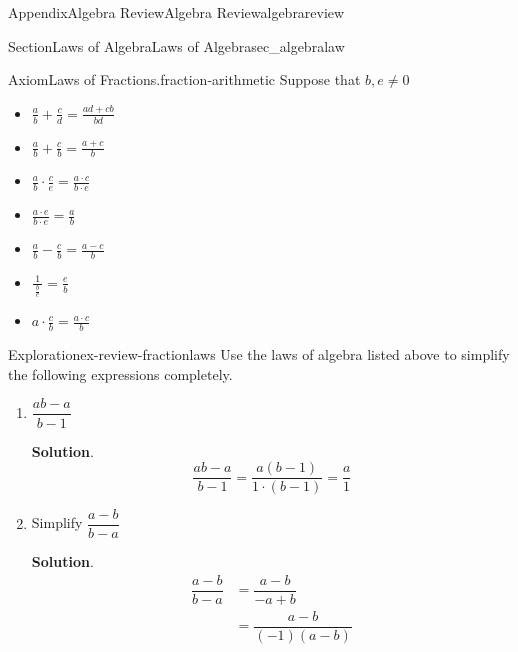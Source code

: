 \documentclass{tufte-book}
\newcommand{\blocktitlefont}{\relax}
\numberwithin{equation}{chapter}
\newcommand{\amp}{&}
\begin{document}
\begin{appendixptx}{Appendix}{Algebra Review}{}{Algebra Review}{}{}{algebrareview}
\begin{sectionptx}{Section}{Laws of Algebra}{}{Laws of Algebra}{}{}{sec_algebralaw}
\begin{axiom}{Axiom}{Laws of Fractions.}{}{fraction-arithmetic}
Suppose that \(b,e\neq 0\)%
\begin{sidebyside}{2}{0.1}{0.1}{0}%
\begin{sbspanel}{0.4}%
%
\begin{itemize}[label=$\circ$]
\item{}\(\displaystyle \frac{a}{b} + \frac{c}{d} = \frac{ad + cb}{bd}\)%
\item{}\(\displaystyle \frac{a}{b} + \frac{c}{b}=  \frac{a+c}{b}\)%
\item{}\(\displaystyle \frac{a}{b} \cdot \frac{c}{e} =  \frac{a\cdot c}{b\cdot e}\)%
\item{} \(\displaystyle \frac{a\cdot e}{b\cdot e} = \frac{a}{b}\)%
\end{itemize}
\end{sbspanel}%
\begin{sbspanel}{0.4}%
%
\begin{itemize}[label=$\circ$]
\item{}\(\displaystyle \frac{a}{b} - \frac{c}{b} =  \frac{a-c}{b}\)%
\item{}\(\displaystyle \frac{1}{\ \frac{b}{e}\ }=  \frac{e}{b}\)%
\item{}\(\displaystyle a\cdot \frac{c}{b}=  \frac{a\cdot c}{b}\)%
\end{itemize}
\end{sbspanel}%
\end{sidebyside}%
\end{axiom}
\begin{exploration}{Exploration}{}{ex-review-fractionlaws}%
Use the laws of algebra listed above to simplify the following expressions completely.%
\begin{enumerate}[font=\bfseries,label=(\alph*),ref=\alph*]%
\item{}\(\dfrac{ab - a}{b-1}\)%
\par\smallskip%
\noindent\textbf{\blocktitlefont Solution}.\hypertarget{ex-review-fractionlaws-2-2}{}\quad{}%
\begin{equation*}
\dfrac{ab - a}{b-1} = \dfrac{a(b-1)}{1\cdot (b-1)} = \dfrac{a}{1}
\end{equation*}
%
\item{}Simplify \(\dfrac{a-b}{b-a}\)%
\par\smallskip%
\noindent\textbf{\blocktitlefont Solution}.\hypertarget{ex-review-fractionlaws-3-2}{}\quad{}%
\begin{align*}
\dfrac{a-b}{b-a} \amp = \dfrac{a-b}{-a + b }\\
\amp = \dfrac{a-b}{(-1) ( a - b)}\\

\end{align*}
\end{enumerate}
\end{exploration}
\end{sectionptx}
\end{appendixptx}
\end{document}
